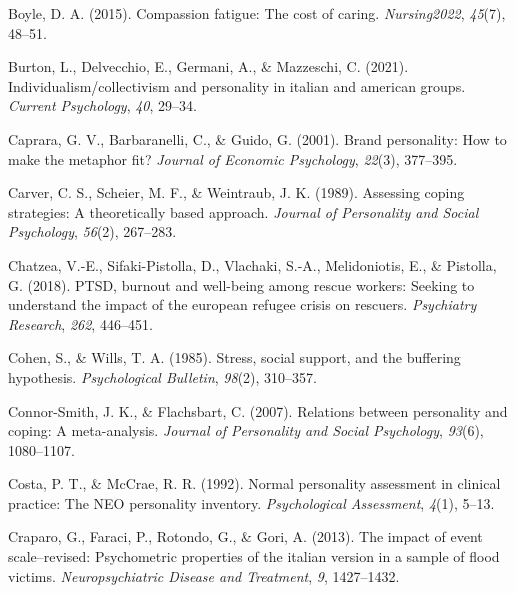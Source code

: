 \documentclass[
  man]{apa7}
\newlength{\cslhangindent}
\newlength{\cslentryspacingunit} %
\newenvironment{CSLReferences}[2] %
 {%
  \setlength{\parindent}{0pt}
  \ifodd #1
  \let\oldpar\par
  \def\par{\hangindent=\cslhangindent\oldpar}
  \fi
  \setlength{\parskip}{#2\cslentryspacingunit}
 }%
 {}
\begin{document}
\begin{CSLReferences}{1}{0}
\leavevmode{}%
Boyle, D. A. (2015). Compassion fatigue: The cost of caring. \emph{Nursing2022}, \emph{45}(7), 48--51.

\leavevmode{}%
Burton, L., Delvecchio, E., Germani, A., \& Mazzeschi, C. (2021). Individualism/collectivism and personality in italian and american groups. \emph{Current Psychology}, \emph{40}, 29--34.

\leavevmode{}%
Caprara, G. V., Barbaranelli, C., \& Guido, G. (2001). Brand personality: How to make the metaphor fit? \emph{Journal of Economic Psychology}, \emph{22}(3), 377--395.

\leavevmode{}%
Carver, C. S., Scheier, M. F., \& Weintraub, J. K. (1989). Assessing coping strategies: A theoretically based approach. \emph{Journal of Personality and Social Psychology}, \emph{56}(2), 267--283.

\leavevmode{}%
Chatzea, V.-E., Sifaki-Pistolla, D., Vlachaki, S.-A., Melidoniotis, E., \& Pistolla, G. (2018). PTSD, burnout and well-being among rescue workers: Seeking to understand the impact of the european refugee crisis on rescuers. \emph{Psychiatry Research}, \emph{262}, 446--451.

\leavevmode{}%
Cohen, S., \& Wills, T. A. (1985). Stress, social support, and the buffering hypothesis. \emph{Psychological Bulletin}, \emph{98}(2), 310--357.

\leavevmode{}%
Connor-Smith, J. K., \& Flachsbart, C. (2007). Relations between personality and coping: A meta-analysis. \emph{Journal of Personality and Social Psychology}, \emph{93}(6), 1080--1107.

\leavevmode{}%
Costa, P. T., \& McCrae, R. R. (1992). Normal personality assessment in clinical practice: The NEO personality inventory. \emph{Psychological Assessment}, \emph{4}(1), 5--13.

\leavevmode{}%
Craparo, G., Faraci, P., Rotondo, G., \& Gori, A. (2013). The impact of event scale--revised: Psychometric properties of the italian version in a sample of flood victims. \emph{Neuropsychiatric Disease and Treatment}, \emph{9}, 1427--1432.


\end{CSLReferences}
\end{document}

